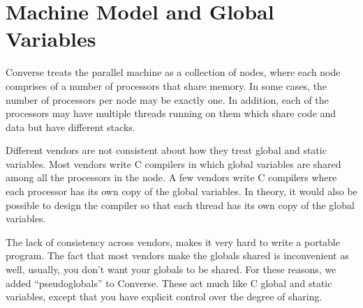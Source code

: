 %
%
%
%
%
%
%
%
%
%
%

\chapter{Machine Model and Global Variables}

Converse treats the parallel machine as a collection of nodes, where
each node comprises of a number of processors that share memory.  In
some cases, the number of processors per node may be exactly one.  In
addition, each of the processors may have multiple threads running on
them which share code and data but have different stacks.

Different vendors are not consistent about how they treat global and static
variables.  Most vendors write C compilers in which global variables are
shared among all the processors in the node.  A few vendors write C
compilers where each processor has its own copy of the global variables.
In theory, it would also be possible to design the compiler so that
each thread has its own copy of the global variables.

The lack of consistency across vendors, makes it very hard to write a
portable program.  The fact that most vendors make the globals shared
is inconvenient as well, usually, you don't want your globals to be
shared.  For these reasons, we added ``pseudoglobals'' to Converse.
These act much like C global and static variables, except that you have
explicit control over the degree of sharing.


